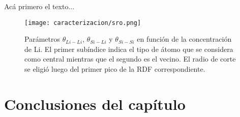 Acá primero el texto...
\begin{figure}[th]
    \centering
    \texttt{[image: caracterizacion/sro.png]}
    \caption{Parámetros $\theta_{Li-Li}$, $\theta_{Si-Li}$ y $\theta_{Si-Si}$ 
    en función de la concentración de Li. El primer subíndice indica el tipo de
    átomo que se considera como central mientras que el segundo es el vecino. El
    radio de corte se eligió luego del primer pico de la RDF correspondiente.}
    \label{fig:sro}
\end{figure}


\section{Conclusiones del capítulo}

